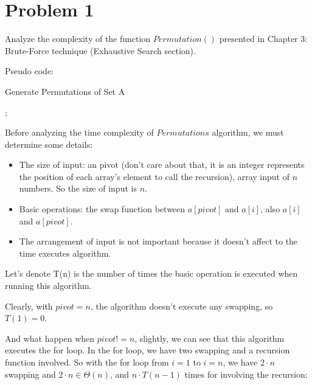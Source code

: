 \documentclass[a4paper]{article}
\begin{document}
\section{Problem 1}
Analyze the complexity of the function $Permutation()$ presented in Chapter 3: Brute-Force technique (Exhaustive Search section). \par
Pseudo code: \par
\begin{algorithm}
\renewcommand{\thealgorithm}{}
    \caption{Generate Permutations of Set A}
    
    \begin{algorithmic}[1]
     
            \State {};
        \Else
            \State {}
            \State {}
            \State {}
            \EndFor
        \EndIf
    \EndProcedure
        
    \end{algorithmic}

\end{algorithm}
Before analyzing the time complexity of $Permutations$ algorithm, we must determine some details:
\begin{itemize}
    \item The size of input: an pivot (don't care about that, it is an integer represents the position of each array's element to call the recursion), array input of $n$ numbers. So the size of input is $n$.
    \item Basic operations: the swap function between $a[pivot]$ and $a[i]$, also $a[i]$ and $a[pivot]$.
    \item The arrangement of input is not important because it doesn't affect to the time executes algorithm.
\end{itemize}
Let's denote T(n) is the number of times the basic operation is executed when running this algorithm. \par
Clearly, with $pivot=n$, the algorithm doesn't execute any swapping, so $T(1)=0$. \par
And what happen when $pivot != n$, slightly, we can see that this algorithm executes the for loop. In the for loop, we have two swapping and a recursion function involved. So with the for loop from $i=1$ to $i=n$, we have $2 \cdot n$ swapping and $2\cdot n \in \Theta(n) $, and $n \cdot T(n-1)$ times for involving the recursion:
\end{document}
